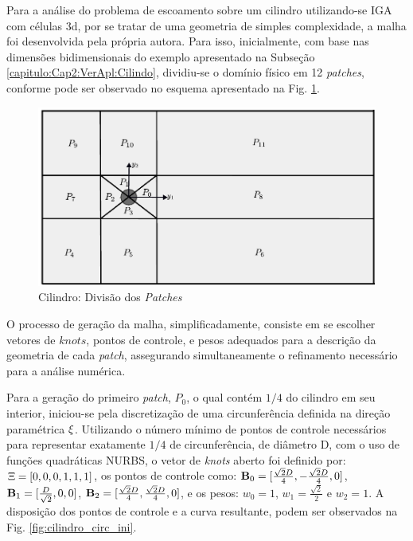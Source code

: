 \documentclass[tese_patricia]{subfiles}
\begin{document}
Para a análise do problema de escoamento sobre um cilindro utilizando-se IGA  com células 3d, por se tratar de uma geometria de simples complexidade, a malha foi desenvolvida pela própria autora. Para isso, inicialmente, com base nas dimensões bidimensionais do exemplo apresentado na Subseção \ref{capitulo:Cap2:VerApl:Cilindo}, dividiu-se o domínio físico em 12 \textit{patches}, conforme pode ser observado no esquema apresentado na Fig. \ref{fig:cilindro_IGA_patches}.

\begin{figure}[htb!]
	\centering 
	\includegraphics[scale=0.7,trim=0cm 0cm 0cm 0cm, clip=true]{Imagens/Cap3/cilindro_iga_patches.pdf}	
	\caption{Cilindro: Divisão dos \textit{Patches} }
	\label{fig:cilindro_IGA_patches}
\end{figure}

O processo de geração da malha, simplificadamente, consiste em se escolher vetores de $knots$, pontos de controle, e pesos adequados para a descrição da geometria de cada \textit{patch}, assegurando simultaneamente o refinamento necessário para a análise numérica.

Para a geração do primeiro \textit{patch}, $P_0$, o qual contém $1/4$ do cilindro em seu interior, iniciou-se pela discretização de uma circunferência definida na direção paramétrica $\xi$. Utilizando o número mínimo de pontos de controle necessários para representar exatamente $1/4$ de circunferência, de diâmetro D, com o uso de funções quadráticas NURBS, o vetor de \textit {knots} aberto foi definido por: $\Xi=\left[0,0,0,1,1,1\right]$, os pontos de controle como: $\mathbf{B}_0=[\frac{\sqrt{2}D}{4},-\frac{\sqrt{2}D}{4},0]$, $\mathbf{B}_1=[\frac{D}{\sqrt{2}},0,0]$, $\mathbf{B}_2=[\frac{\sqrt{2}D}{4},\frac{\sqrt{2}D}{4},0]$, e os pesos: $w_0 = 1$, $w_1 = \frac{\sqrt{2}}{2}$ e $w_2 = 1$. A disposição dos pontos de controle e a curva resultante, podem ser observados na Fig. \ref{fig:cilindro_circ_ini}.
\end{document}

